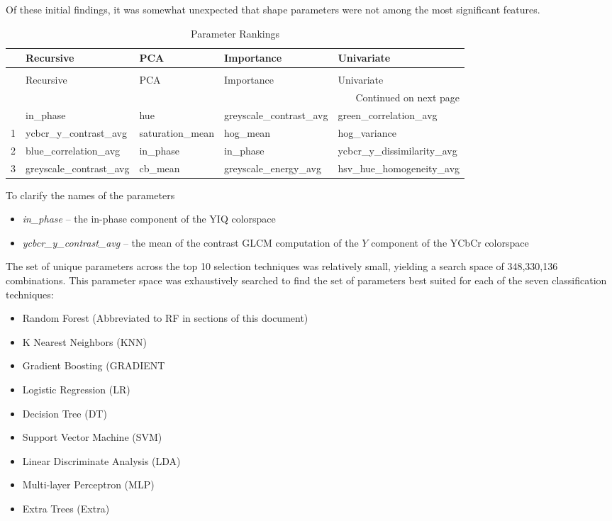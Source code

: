 \documentclass[letterpaper]{article}
\begin{document}
{Of these initial findings, it was somewhat unexpected that shape parameters were not among the most significant features.

%
%

\begin{longtable}{lllll}
\caption[Parameter Rankings]{Parameter Rankings}\\
\toprule
{} &               Recursive &              PCA &              Importance &                 Univariate \\
\midrule
\endfirsthead
\caption[]{Parameter Rankings} \\
\toprule
{} &               Recursive &              PCA &              Importance &                 Univariate \\
\midrule
\endhead
\midrule
\multicolumn{5}{r}{{Continued on next page}} \\
\midrule
\endfoot

\bottomrule
\endlastfoot
0 &                in\_phase &              hue &  greyscale\_contrast\_avg &      green\_correlation\_avg \\
1 &    ycbcr\_y\_contrast\_avg &  saturation\_mean &                hog\_mean &               hog\_variance \\
2 &    blue\_correlation\_avg &         in\_phase &                in\_phase &  ycbcr\_y\_dissimilarity\_avg \\
3 &  greyscale\_contrast\_avg &          cb\_mean &    greyscale\_energy\_avg &    hsv\_hue\_homogeneity\_avg \\
\end{longtable}

 To clarify the names of the parameters
 \begin{itemize}
 	\item{\textit{in\_phase} -- the in-phase component of the YIQ colorspace}
 	\item{\textit{ycbcr\_y\_contrast\_avg} -- the mean of the contrast GLCM computation of the $Y$ component of the YCbCr colorspace}
 \end{itemize}
 	

The set of unique parameters across the top 10 selection techniques was relatively small, yielding a search space of 348,330,136 combinations. This parameter space was exhaustively searched to find the set of parameters best suited for each of the  seven classification techniques:
\begin{itemize}
	\item{Random Forest (Abbreviated to RF in sections of this document)}
	\item{K Nearest Neighbors (KNN)}
	\item{Gradient Boosting (GRADIENT}
	\item{Logistic Regression (LR)}
	\item{Decision Tree (DT)}
	\item{Support Vector Machine (SVM)}
	\item{Linear Discriminate Analysis (LDA)}
	\item{Multi-layer Perceptron (MLP)}
	\item{Extra Trees (Extra)}
\end{itemize}

}
\end{document}
